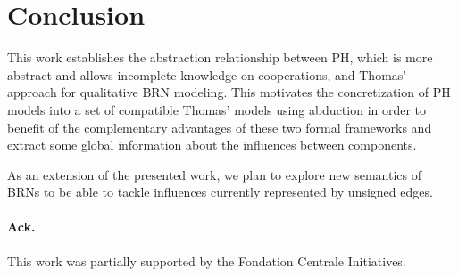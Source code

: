 \section{Conclusion}

This work establishes the abstraction relationship between PH, which is more abstract and allows incomplete knowledge on cooperations, and Thomas' approach for qualitative BRN modeling.
This motivates the concretization of PH models into a set of compatible Thomas' models using abduction in order to benefit of the complementary advantages of these two formal frameworks and extract some global information about the influences between components.

As an extension of the presented work, we plan to explore new semantics of BRNs to be able to tackle influences currently represented by unsigned edges.

\paragraph{Ack.}
This work was partially supported by the Fondation Centrale Initiatives.
